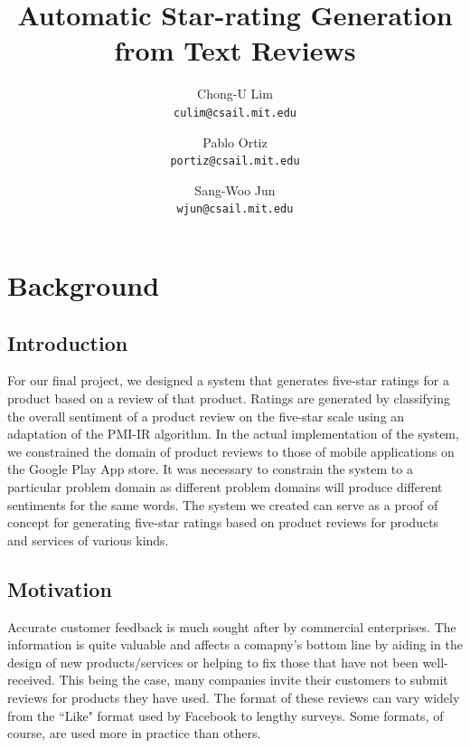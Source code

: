 \documentclass[11pt]{report} %
\title{Automatic Star-rating Generation from Text Reviews}
\author{
  Chong-U Lim\\
  \texttt{culim@csail.mit.edu}
  \and
  Pablo Ortiz\\
  \texttt{portiz@csail.mit.edu}
  \and
 Sang-Woo Jun\\
  \texttt{wjun@csail.mit.edu}
}
\begin{document}
\maketitle

\tableofcontents

\newpage
\chapter{Background}
\section{Introduction}
For our final project, we designed a system that generates five-star ratings for a product based on a review of that product. Ratings are generated by classifying the overall sentiment of a product review on the five-star scale using an adaptation of the PMI-IR algorithm. In the actual implementation of the system, we constrained the domain of product reviews to those of mobile applications on the Google Play App store. It was necessary to constrain the system to a particular problem domain as different problem domains will produce different sentiments for the same words. The system we created can serve as a proof of concept for generating five-star ratings based on product reviews for products and services of various kinds.

\section{Motivation}
Accurate customer feedback is much sought after by commercial enterprises. The information is quite valuable and affects a comapny's bottom line by aiding in the design of new products/services or helping to fix those that have not been well-received. This being the  case, many companies invite their customers to submit reviews for products they have used. The format of these reviews can vary widely from the ``Like" format used by Facebook to lengthy surveys. Some formats, of course, are used more in practice than others.
\end{document}
